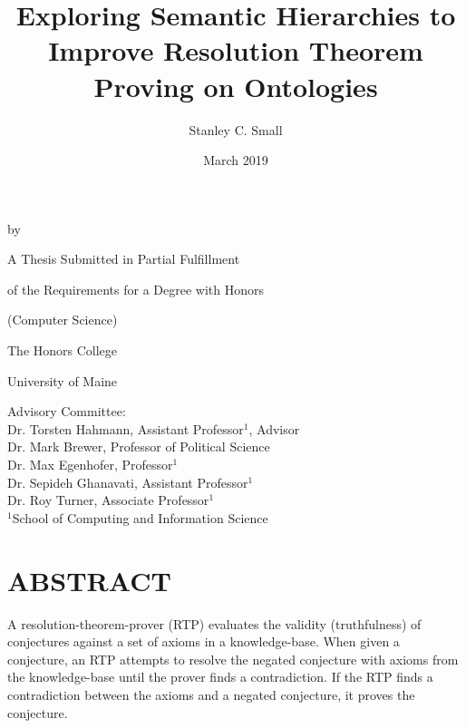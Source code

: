 \documentclass{article}
\title{Exploring Semantic Hierarchies to Improve Resolution Theorem Proving on Ontologies}
\author{Stanley C. Small}
\date{March 2019}
\begin{document}
\begin{titlepage}
	\makeatletter
		\begin{center}
   				\MakeUppercase{\@title} \par
  				\smallskip 
 				\vspace{.15in} by \par
 				\smallskip
  				\vspace{.15in} \@author \par
  				\vspace{1in}
 				A Thesis Submitted in Partial Fulfillment  \par
  				of the Requirements for a Degree with Honors \par
  				(Computer Science) \par
  				\vspace{.75in}
  				The Honors College \par
  				University of Maine \par
  				\@date \par
 				\vfill
   		\end{center}
	\makeatother
	\begin{flushleft}
		Advisory Committee: \\
		\hspace{.3in} Dr. Torsten Hahmann, Assistant Professor$^{1}$, Advisor \\
		\hspace{.3in} Dr. Mark Brewer, Professor of Political Science \\
		\hspace{.3in} Dr. Max Egenhofer, Professor$^{1}$ \\
		\hspace{.3in} Dr. Sepideh Ghanavati, Assistant Professor$^{1}$ \\
		\hspace{.3in} Dr. Roy Turner, Associate Professor$^{1}$ \\
		\hfill \break
		\hspace{.3in} $^{1}$School of Computing and Information Science
	\end{flushleft}
\end{titlepage}

\newpage
{}
\vspace*{.05in}
\section*{\MakeUppercase{Abstract}}
A resolution-theorem-prover (RTP) evaluates the validity (truthfulness) of conjectures against a set of axioms in a knowledge-base. When given a conjecture, an RTP attempts to resolve the negated conjecture with axioms from the knowledge-base until the prover finds a contradiction. If the RTP finds a contradiction between the axioms and a negated conjecture, it proves the conjecture. 
\end{document}
